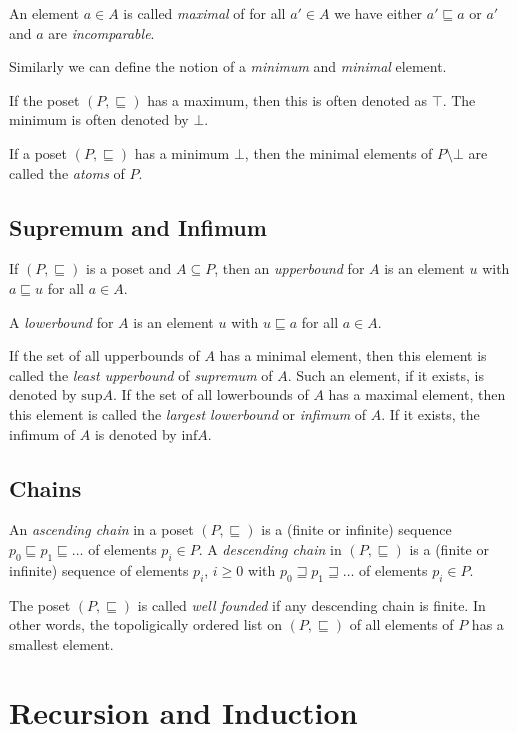 \documentclass[fleqn]{article}
\begin{document}
An element $a \in A$ is called \textit{maximal} of for all $a' \in A$ we have either 
$a' \sqsubseteq a$ or $a'$ and $a$ are \textit{incomparable}.

Similarly we can define the notion of a \textit{minimum} and \textit{minimal} element.

If the poset $(P, \sqsubseteq)$ has a maximum, then this is often denoted as $\top$.
The minimum is often denoted by $\bot$.

If a poset $(P, \sqsubseteq)$ has a minimum $\bot$, then the minimal elements
of $P \setminus {\bot}$ are called the \textit{atoms} of $P$.

\subsection{Supremum and Infimum}
If $(P, \sqsubseteq)$ is a poset and $A \subseteq P$, then an \textit{upperbound}
for $A$ is an element $u$ with $a \sqsubseteq u$ for all $a \in A$.

A \textit{lowerbound} for $A$ is an element $u$ with $u \sqsubseteq a$ for all $a \in A$.

If the set of all upperbounds of $A$ has a minimal element, then this element is called
the \textit{least upperbound} of \textit{supremum} of $A$. Such an element, if it exists,
is denoted by $\text{sup} A$. If the set of all lowerbounds of $A$ has a maximal element,
then this element is called the \textit{largest lowerbound} or \textit{infimum} of $A$.
If it exists, the infimum of $A$ is denoted by $\text{inf} A$.

\subsection{Chains}
An \textit{ascending chain} in a poset $(P, \sqsubseteq)$ is a (finite or infinite)
sequence $p_0 \sqsubseteq p_1 \sqsubseteq \dots$ of elements $p_i \in P$. A \textit{descending chain}
in $(P, \sqsubseteq)$ is a (finite or infinite) sequence of elements $p_i$, $i \geq 0$ with
$p_0 \sqsupseteq p_1 \sqsupseteq \dots$ of elements $p_i \in P$.

The poset $(P, \sqsubseteq)$ is called \textit{well founded} if any descending chain is finite.
In other words, the topoligically ordered list on $(P, \sqsubseteq)$ of all elements
of $P$ has a smallest element.

\section{Recursion and Induction}
\end{document}
